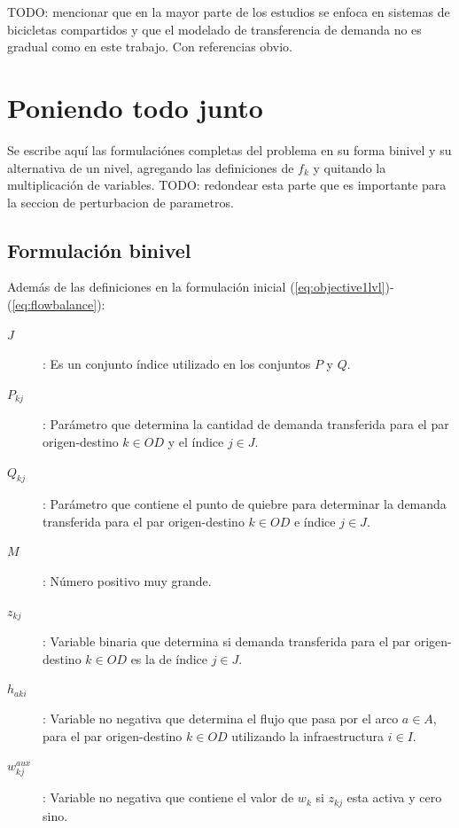 \documentclass{article}
\begin{document}
  TODO: mencionar que en la mayor parte de los estudios se enfoca en sistemas de bicicletas compartidos y que el modelado de transferencia de demanda no es gradual como en este trabajo. Con referencias obvio.

  \section*{Poniendo todo junto}

  Se escribe aquí las formulaciónes completas del problema en su forma binivel y su alternativa de un nivel, agregando las definiciones de $f_k$ y quitando la multiplicación de variables. TODO: redondear esta parte que es importante para la seccion de perturbacion de parametros.

  \subsection*{Formulación binivel}

  Además de las definiciones en la formulación inicial (\ref{eq:objective1lvl})-(\ref{eq:flowbalance}):

  \begin{description}
    \item[$J$]: Es un conjunto índice utilizado en los conjuntos $P$ y $Q$.
    \item[$P_{kj}$]: Parámetro que determina la cantidad de demanda transferida para el par origen-destino $k \in OD$ y el índice $j \in J$.
    \item[$Q_{kj}$]: Parámetro que contiene el punto de quiebre para determinar la demanda transferida para el par origen-destino $k \in OD$ e índice $j \in J$.
    \item[$M$]: Número positivo muy grande. 
    \item[$z_{kj}$]: Variable binaria que determina si demanda transferida para el par origen-destino $k \in OD$ es la de índice $j \in J$.
    \item[$h_{aki}$]: Variable no negativa que determina el flujo que pasa por el arco $a \in A$, para el par origen-destino $k \in OD$ utilizando la infraestructura $i \in I$.
    \item[$w^{aux}_{kj}$]: Variable no negativa que contiene el valor de $w_{k}$ si $z_{kj}$ esta activa y cero sino. 
  \end{description}
\end{document}
